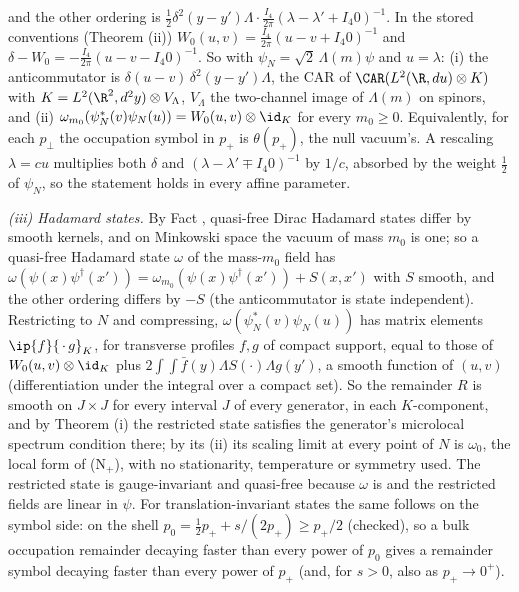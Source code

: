 and the other ordering is $\tfrac12\delta^{2}(y - y')\Lambda\cdot\tfrac{I_{4}}{2\pi}(\lambda - \lambda' + I_{4}0)^{-1}$. In the stored conventions (Theorem (ii)) $W_{0}(u, v) = \tfrac{I_{4}}{2\pi}(u - v + I_{4}0)^{-1}$ and $\delta - W_{0} = -\tfrac{I_{4}}{2\pi}(u - v - I_{4}0)^{-1}$. So with $\psi_{N} = \sqrt{2}\,\Lambda(m)\psi$ and $u = \lambda$: (i) the anticommutator is $\delta(u - v)\,\delta^{2}(y - y')\Lambda$, the CAR of $\CAR(L^{2}(\R, du)\otimes K)$ with $K = L^{2}(\R^{2}, d^{2}y)\otimes V_{\Lambda}$, $V_{\Lambda}$ the two-channel image of $\Lambda(m)$ on spinors, and (ii) $\omega_{m_{0}}(\psi_{N}^{*}(v)\psi_{N}(u)) = W_{0}(u, v)\otimes\id_{K}$ for every $m_{0} \ge 0$. Equivalently, for each $p_{\perp}$ the occupation symbol in $p_{+}$ is $\theta(p_{+})$, the null vacuum's. A rescaling $\lambda = cu$ multiplies both $\delta$ and $(\lambda - \lambda' \mp I_{4}0)^{-1}$ by $1/c$, absorbed by the weight $\tfrac12$ of $\psi_{N}$, so the statement holds in every affine parameter.

\emph{(iii) Hadamard states.} By Fact , quasi-free Dirac Hadamard states differ by smooth kernels, and on Minkowski space the vacuum of mass $m_{0}$ is one; so a quasi-free Hadamard state $\omega$ of the mass-$m_{0}$ field has $\omega(\psi(x)\psi^{\dagger}(x')) = \omega_{m_{0}}(\psi(x)\psi^{\dagger}(x')) + S(x, x')$ with $S$ smooth, and the other ordering differs by $-S$ (the anticommutator is state independent). Restricting to $N$ and compressing, $\omega(\psi_{N}^{*}(v)\psi_{N}(u))$ has matrix elements $\ip{f}{\,\cdot\,g}_{K}$, for transverse profiles $f, g$ of compact support, equal to those of $W_{0}(u, v)\otimes\id_{K}$ plus $2\int\!\!\int \bar f(y)\Lambda S(\cdot)\Lambda g(y')$, a smooth function of $(u, v)$ (differentiation under the integral over a compact set). So the remainder $R$ is smooth on $J\times J$ for every interval $J$ of every generator, in each $K$-component, and by Theorem (i) the restricted state satisfies the generator's microlocal spectrum condition there; by its (ii) its scaling limit at every point of $N$ is $\omega_{0}$, the local form of (N$_{+}$), with no stationarity, temperature or symmetry used. The restricted state is gauge-invariant and quasi-free because $\omega$ is and the restricted fields are linear in $\psi$. For translation-invariant states the same follows on the symbol side: on the shell $p_{0} = \tfrac12 p_{+} + s/(2p_{+}) \ge p_{+}/2$ (checked), so a bulk occupation remainder decaying faster than every power of $p_{0}$ gives a remainder symbol decaying faster than every power of $p_{+}$ (and, for $s > 0$, also as $p_{+} \to 0^{+}$).

